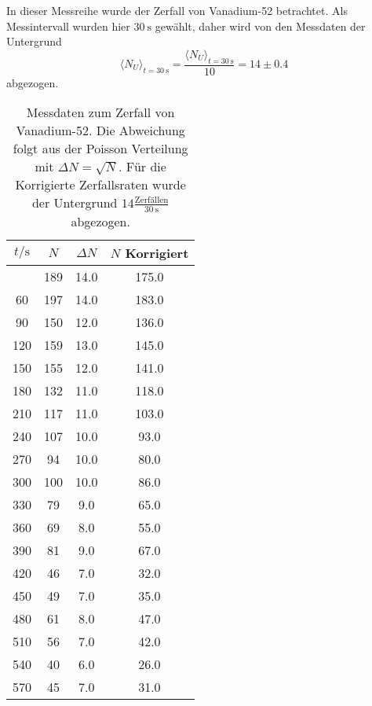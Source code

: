 In dieser Messreihe wurde der Zerfall von Vanadium-52 betrachtet. Als Messintervall wurden hier
$\SI{30}{\second}$ gewählt, daher wird von den Messdaten der Untergrund
\begin{equation}
	\langle N_U \rangle_{t=\SI{30}{\second}} = 
	\frac{\langle N_U \rangle_{t=\SI{30}{\second}}}{10} = 14 \pm 0.4
\end{equation}
abgezogen.

\begin{longtable}{c c c c}
	\caption{Messdaten zum Zerfall von Vanadium-52. Die Abweichung folgt aus der Poisson Verteilung
		mit $\Delta N = \sqrt{N}$. Für die Korrigierte Zerfallsraten wurde der Untergrund 
	$14 \frac{\text{Zerfällen}}{\SI{30}{\second}}$ abgezogen.} \label{tab:vanadium} \\
		\hline
		$t / \si{\second}$ & $N$ & $\Delta N$ &$N$ Korrigiert \\
		\hline
		\endhead
		\hline
		\endfoot
		30   	&      189  	& 14.0 &      175.0 \\
		  60   	&      197  	& 14.0 &      183.0 \\
		  90   	&      150  	& 12.0 &      136.0 \\
		 120   	&      159  	& 13.0 &      145.0 \\
		 150   	&      155  	& 12.0 &      141.0 \\
		 180   	&      132  	& 11.0 &      118.0 \\
		 210   	&      117  	& 11.0 &      103.0 \\
		 240   	&      107  	& 10.0 &       93.0 \\
		 270   	&       94  	& 10.0 &       80.0 \\
		 300   	&      100  	& 10.0 &       86.0 \\
		 330   	&       79  	&  9.0 &       65.0 \\
		 360   	&       69  	&  8.0 &       55.0 \\
		 390   	&       81  	&  9.0 &       67.0 \\
		 420   	&       46  	&  7.0 &       32.0 \\
		 450   	&       49  	&  7.0 &       35.0 \\
		 480   	&       61  	&  8.0 &       47.0 \\
		 510   	&       56  	&  7.0 &       42.0 \\
		 540   	&       40  	&  6.0 &       26.0 \\
		 570   	&       45  	&  7.0 &       31.0 \\

\end{longtable}
